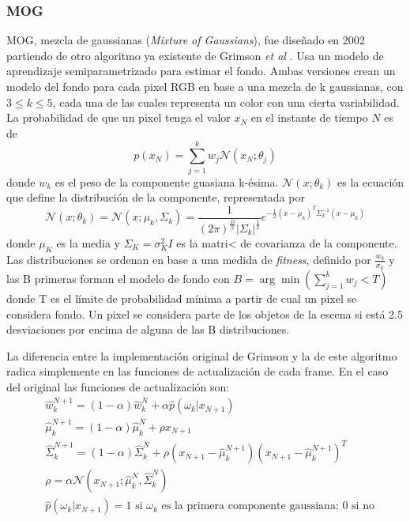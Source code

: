 \subsubsection*{MOG}
MOG, mezcla de gaussianas (\textit{Mixture of Gaussians}), fue diseñado en 2002 \cite{KaewTraKulPong2002} partiendo de otro algoritmo ya existente de Grimson \textit{et al} \cite{698583,784637,868677}. Usa un modelo de aprendizaje semiparametrizado para estimar el fondo. Ambas versiones crean un modelo del fondo para cada pixel RGB en base a una mezcla de k gaussianas, con $3\leq k \leq 5$, cada una de las cuales representa un color con una cierta variabilidad. La probabilidad de que un pixel tenga el valor $x_N$ en el instante de tiempo $N$ es de
\[
    p(x_N) = \sum_{j=1}^{k} w_j \mathcal{N} (x_N;\theta_j )
\]
donde $w_k$ es el peso de la componente guasiana k-ésima. $\mathcal{N} (x;\theta_k)$ es la ecuación que define la distribución de la componente, representada por
\[
    \mathcal{N}(x;\theta_k) = \mathcal{N}(x;\mu_k, \Sigma_k) = \frac{1}{(2\pi)^{\frac{D}{2}}|\Sigma_k|^\frac{1}{2}}e^{-\frac{1}{2}(x-\mu_k)^T\Sigma_k^{-1}(x-\mu_k)}
\]
donde $\mu_K$ es la media y $\Sigma_K = \sigma_K^2I$ es la matri< de covarianza de la componente. Las distribuciones se ordenan en base a una medida de \textit{fitness}, definido por $\frac{w_k}{\sigma_k}$ y las B primeras forman el modelo de fondo con $B = \arg\min (\sum_{j=1}^{k} w_j < T)$ donde T es el límite de probabilidad mínima a partir de cual un pixel se considera fondo. Un pixel se considera parte de los objetos de la escena si está 2.5 desviaciones por encima de alguna de las B distribuciones.

La diferencia entre la implementación original de Grimson y la de este algoritmo radica simplemente en las funciones de actualización de cada frame. En el caso del original las funciones de actualización son: 
\begin{align*}
    &\hat{w}_k^{N+1} = (1 - \alpha)\hat{w}_k^{N} + \alpha\hat{p}(\omega_k | x_{N+1}) \\
    &\hat{\mu}_k^{N+1} = (1 - \alpha)\hat{\mu}_k^{N} + \rho x_{N+1} \\
    &\hat{\Sigma}_k^{N+1} = (1 - \alpha)\hat{\Sigma}_k^{N} + \rho (x_{N+1} - \hat{\mu}_k^{N+1})(x_{N+1} - \hat{\mu}_k^{N+1})^T \\
    &\rho = \alpha \mathcal{N}(x_{N+1};\hat{\mu}_k^N, \hat{\Sigma}_k^N) \\
    &\hat{p}(\omega_k | x_{N+1}) = \text{1 si $\omega_k$ es la primera componente gaussiana; 0 si no}
\end{align*}

